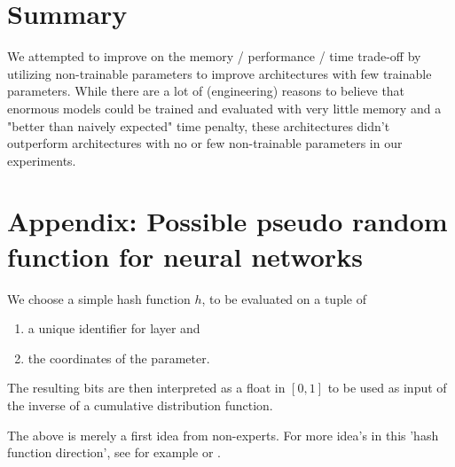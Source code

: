 \documentclass[]{article}
\begin{document}
\begin{multicols}{2}
	\section{Summary}
	We attempted to improve on the memory / performance / time trade-off by utilizing non-trainable parameters to improve architectures with few trainable parameters. While there are a lot of (engineering) reasons to believe that enormous models could be trained and evaluated with very little memory and a "better than naively expected" time penalty, these architectures didn't outperform architectures with no or few non-trainable parameters in our experiments.
	
	\appendix
	\section*{Appendix: Possible pseudo random function for neural networks}
	We choose a simple hash function $h$, to be evaluated on a tuple of
	\begin{enumerate}
		\itemsep0em
		\item a unique identifier for layer and
		\item the coordinates of the parameter.
	\end{enumerate}
	The resulting bits are then interpreted as a float in $[0, 1]$ to be used as input of the inverse of a cumulative distribution function.
	
	The above is merely a first idea from non-experts. For more idea's in this 'hash function direction', see for example \cite{TAOCP364} or \cite{wiki:Hash_function}.

	
	
\end{multicols}
\end{document}
